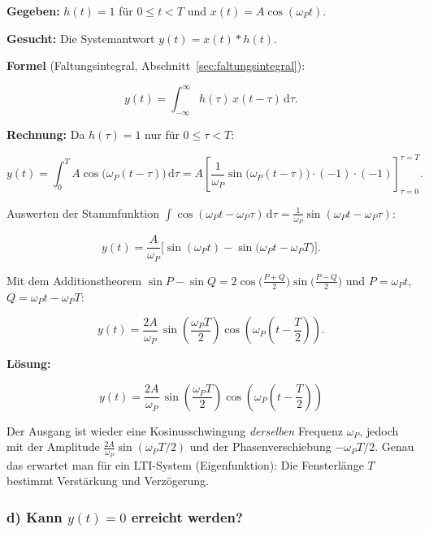\begin{beispiel}

\textbf{Gegeben:} $h(t) = 1$ für $0 \leq t < T$ und
$x(t) = A\cos(\omega_P t)$.

\textbf{Gesucht:} Die Systemantwort $y(t) = x(t) * h(t)$.

\textbf{Formel} (Faltungsintegral, Abschnitt~\ref{sec:faltungsintegral}):

$$
y(t) = \int_{-\infty}^{\infty} h(\tau)\, x(t - \tau)\,\mathrm{d}\tau.
$$

\textbf{Rechnung:} Da $h(\tau) = 1$ nur für $0 \leq \tau < T$:

$$
y(t) = \int_{0}^{T} A\cos\!\big(\omega_P (t - \tau)\big)\,\mathrm{d}\tau
= A\left[\frac{1}{\omega_P}\sin\!\big(\omega_P(t - \tau)\big)\cdot(-1)\cdot(-1)\right]_{\tau=0}^{\tau=T}.
$$

Auswerten der Stammfunktion
$\int \cos(\omega_P t - \omega_P\tau)\,\mathrm{d}\tau
= \tfrac{1}{\omega_P}\sin(\omega_P t - \omega_P\tau)$:

$$
y(t) = \frac{A}{\omega_P}\Big[\sin(\omega_P t) - \sin\!\big(\omega_P t - \omega_P T\big)\Big].
$$

Mit dem Additionstheorem
$\sin P - \sin Q = 2\cos\!\big(\tfrac{P+Q}{2}\big)\sin\!\big(\tfrac{P-Q}{2}\big)$
und $P = \omega_P t$, $Q = \omega_P t - \omega_P T$:

$$
y(t) = \frac{2A}{\omega_P}\,\sin\!\left(\frac{\omega_P T}{2}\right)
\cos\!\left(\omega_P\!\left(t - \frac{T}{2}\right)\right).
$$

\textbf{Lösung:}

$$
\boxed{\;y(t) = \frac{2A}{\omega_P}\,\sin\!\left(\frac{\omega_P T}{2}\right)
\cos\!\left(\omega_P\!\left(t - \frac{T}{2}\right)\right)\;}
$$

Der Ausgang ist wieder eine Kosinusschwingung \emph{derselben} Frequenz
$\omega_P$, jedoch mit der Amplitude
$\tfrac{2A}{\omega_P}\sin(\omega_P T/2)$ und der Phasenverschiebung
$-\omega_P T/2$. Genau das erwartet man für ein LTI-System (Eigenfunktion):
Die Fensterlänge $T$ bestimmt Verstärkung und Verzögerung.

\end{beispiel}

\subsubsection*{d) Kann $y(t) = 0$ erreicht werden?}


